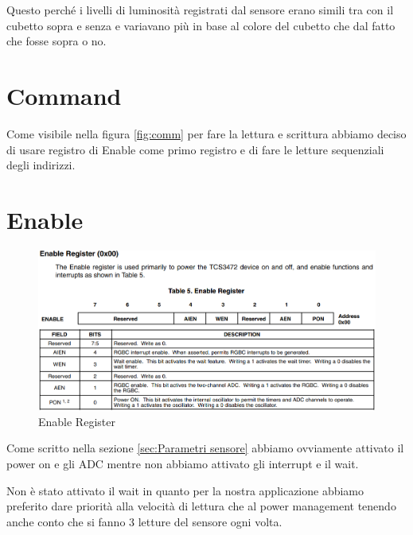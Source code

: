 \documentclass[12pt]{report}
\begin{document}
Questo perché i livelli di luminosità registrati dal sensore erano simili tra con il cubetto sopra e senza e variavano più in base al colore del cubetto che dal fatto che fosse sopra o no.

\section{Command}
Come visibile nella figura \ref{fig:comm} per fare la lettura e scrittura abbiamo deciso di usare registro di Enable come primo registro e di fare le letture sequenziali degli indirizzi.

\section{Enable}

\begin{figure}
    \includegraphics[width=\textwidth]{Immagini_sensore/registro_enable.png}
    \caption{Enable Register}
\end{figure}

Come scritto nella sezione \ref{sec:Parametri sensore} abbiamo ovviamente attivato il power on e gli ADC mentre non abbiamo attivato gli interrupt e il wait.

Non è stato attivato il wait in quanto per la nostra applicazione abbiamo preferito dare priorità alla velocità di lettura che al power management tenendo anche conto che si fanno 3 letture del sensore ogni volta.
\end{document}
